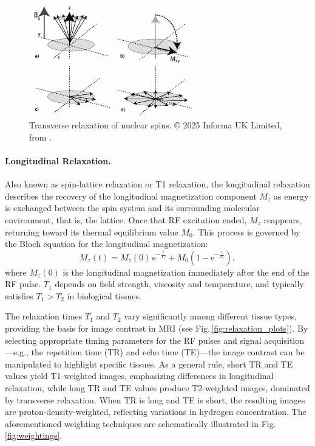 \begin{figure}[htbp]
    \centering
    \includegraphics[width=0.65\textwidth]{figures/transverse_relaxation.png}
    \caption{Transverse relaxation of nuclear spins. © 2025 Informa UK Limited, from \cite{Lanting2010}.}
    \label{fig:transverse_relaxation}
\end{figure}

\paragraph{Longitudinal Relaxation.} Also known as spin-lattice relaxation or T1 relaxation, the longitudinal relaxation describes the recovery of the longitudinal magnetization component $M_z$ as energy is exchanged between the spin system and its surrounding molecular environment, that is, the lattice. Once that RF excitation ended, $M_z$ reappears, returning toward its thermal equilibrium value $M_0$. This process is governed by the Bloch equation for the longitudinal magnetization:
\begin{equation}
    M_z(t)=M_z(0)\,\mathrm{e}^{-\frac{t}{T_1}}+M_0 \left(1-\mathrm{e}^{-\frac{t}{T_1}} \right),
\end{equation}
where $M_z(0)$ is the longitudinal magnetization immediately after the end of the RF pulse. $T_1$ depends on field strength, viscosity and temperature, and typically satisfies $T_1>T_2$ in biological tissues.

The relaxation times $T_1$ and $T_2$ vary significantly among different tissue types, providing the basis for image contrast in MRI (see Fig.\,\ref{fig:relaxation_plots}). By selecting appropriate timing parameters for the RF pulses and signal acquisition---e.g., the repetition time (TR) and echo time (TE)---the image contrast can be manipulated to highlight specific tissues. As a general rule, short TR and TE values yield T1-weighted images, emphasizing differences in longitudinal relaxation, while long TR and TE values produce T2-weighted images, dominated by transverse relaxation. When TR is long and TE is short, the resulting images are proton-density-weighted, reflecting variations in hydrogen concentration. The aforementioned weighting techniques are schematically illustrated in Fig.\,\ref{fig:weightings}.

